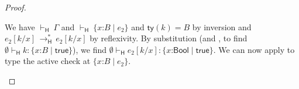 \documentclass[9pt]{extarticle}
\newcommand{\ottnt}[1]{\mathit{#1}}
\newcommand{\ottsym}[1]{#1}
\begin{document}
{\begin{lemma}
\begin{proof}
{\begin{itemize}
\begin{itemize}
We have $ \mathord{  \vdash _{  \mathsf{H}  } }~ \Gamma $ and $ \mathord{  \vdash _{  \mathsf{H}  } }~  \{ \mathit{x} \mathord{:} \ottnt{B} \mathrel{\mid} \ottnt{e_{{\mathrm{2}}}} \}  $ and $ \mathsf{ty} ( \ottnt{k} )   \ottsym{=}  \ottnt{B}$
        by inversion and $ \ottnt{e_{{\mathrm{2}}}}  [  \ottnt{k} / \mathit{x}  ]  \,  \longrightarrow ^{*}_{  \mathsf{H}  }  \,  \ottnt{e_{{\mathrm{2}}}}  [  \ottnt{k} / \mathit{x}  ] $ by
        reflexivity. By substitution (and , to find $ \emptyset   \vdash _{  \mathsf{H}  }  \ottnt{k}  :   \{ \mathit{x} \mathord{:} \ottnt{B} \mathrel{\mid}  \mathsf{true}  \}  $), we find $ \emptyset   \vdash _{  \mathsf{H}  }   \ottnt{e_{{\mathrm{2}}}}  [  \ottnt{k} / \mathit{x}  ]   :   \{ \mathit{x} \mathord{:}  \mathsf{Bool}  \mathrel{\mid}  \mathsf{true}  \}  $. We can now apply  to type the
        active check at $ \{ \mathit{x} \mathord{:} \ottnt{B} \mathrel{\mid} \ottnt{e_{{\mathrm{2}}}} \} $.


\end{itemize}
\end{itemize}}
\end{proof}
\end{lemma}}
\end{document}
